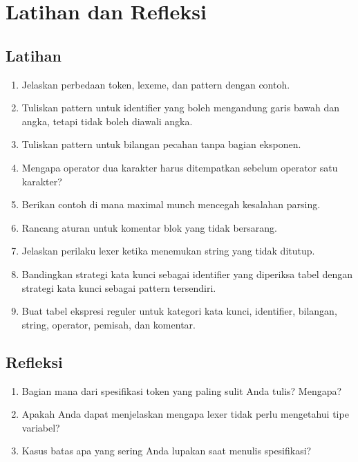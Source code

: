 \section*{Latihan dan Refleksi}

\subsection*{Latihan}
\begin{enumerate}[label=\arabic*.,leftmargin=*]
  \item Jelaskan perbedaan token, lexeme, dan pattern dengan contoh.
  \item Tuliskan pattern untuk identifier yang boleh mengandung garis
        bawah dan angka, tetapi tidak boleh diawali angka.
  \item Tuliskan pattern untuk bilangan pecahan tanpa bagian
        eksponen.
  \item Mengapa operator dua karakter harus ditempatkan sebelum
        operator satu karakter?
  \item Berikan contoh di mana maximal munch mencegah kesalahan
        parsing.
  \item Rancang aturan untuk komentar blok yang tidak bersarang.
  \item Jelaskan perilaku lexer ketika menemukan string yang tidak
        ditutup.
  \item Bandingkan strategi kata kunci sebagai identifier yang
        diperiksa tabel dengan strategi kata kunci sebagai pattern
        tersendiri.
  \item Buat tabel ekspresi reguler untuk kategori kata kunci,
        identifier, bilangan, string, operator, pemisah, dan komentar.
\end{enumerate}

\subsection*{Refleksi}
\begin{reflectionbox}
\begin{enumerate}[label=\arabic*.,leftmargin=*]
  \item Bagian mana dari spesifikasi token yang paling sulit Anda
        tulis? Mengapa?
  \item Apakah Anda dapat menjelaskan mengapa lexer tidak perlu
        mengetahui tipe variabel?
  \item Kasus batas apa yang sering Anda lupakan saat menulis
        spesifikasi?
\end{enumerate}
\end{reflectionbox}

